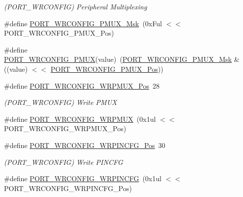 \begin{DoxyCompactItemize}
\begin{DoxyCompactList}\small\item\em (P\+O\+R\+T\+\_\+\+W\+R\+C\+O\+N\+F\+IG) Peripheral Multiplexing \end{DoxyCompactList}\item 
\#define \mbox{\hyperlink{group___s_a_m_d21___p_o_r_t_gaed50ce1ba0629befed40ccf940ea623e}{P\+O\+R\+T\+\_\+\+W\+R\+C\+O\+N\+F\+I\+G\+\_\+\+P\+M\+U\+X\+\_\+\+Msk}}~(0x\+Ful $<$$<$ P\+O\+R\+T\+\_\+\+W\+R\+C\+O\+N\+F\+I\+G\+\_\+\+P\+M\+U\+X\+\_\+\+Pos)
\item 
\#define \mbox{\hyperlink{group___s_a_m_d21___p_o_r_t_ga79d664bf70f1494ebd35f75905b98ca3}{P\+O\+R\+T\+\_\+\+W\+R\+C\+O\+N\+F\+I\+G\+\_\+\+P\+M\+UX}}(value)~(\mbox{\hyperlink{group___s_a_m_d21___p_o_r_t_gaed50ce1ba0629befed40ccf940ea623e}{P\+O\+R\+T\+\_\+\+W\+R\+C\+O\+N\+F\+I\+G\+\_\+\+P\+M\+U\+X\+\_\+\+Msk}} \& ((value) $<$$<$ \mbox{\hyperlink{group___s_a_m_d21___p_o_r_t_gad821493573ea6954861bdb5007458439}{P\+O\+R\+T\+\_\+\+W\+R\+C\+O\+N\+F\+I\+G\+\_\+\+P\+M\+U\+X\+\_\+\+Pos}}))
\item 
\#define \mbox{\hyperlink{group___s_a_m_d21___p_o_r_t_gaf5c01e870b3cd28ea4b5d16e0970f641}{P\+O\+R\+T\+\_\+\+W\+R\+C\+O\+N\+F\+I\+G\+\_\+\+W\+R\+P\+M\+U\+X\+\_\+\+Pos}}~28
\begin{DoxyCompactList}\small\item\em (P\+O\+R\+T\+\_\+\+W\+R\+C\+O\+N\+F\+IG) Write P\+M\+UX \end{DoxyCompactList}\item 
\#define \mbox{\hyperlink{group___s_a_m_d21___p_o_r_t_ga41389a6f616a685fbca4a6cbb6e48206}{P\+O\+R\+T\+\_\+\+W\+R\+C\+O\+N\+F\+I\+G\+\_\+\+W\+R\+P\+M\+UX}}~(0x1ul $<$$<$ P\+O\+R\+T\+\_\+\+W\+R\+C\+O\+N\+F\+I\+G\+\_\+\+W\+R\+P\+M\+U\+X\+\_\+\+Pos)
\item 
\#define \mbox{\hyperlink{group___s_a_m_d21___p_o_r_t_gac9e9a5084c654419e2762a4557fc0fe0}{P\+O\+R\+T\+\_\+\+W\+R\+C\+O\+N\+F\+I\+G\+\_\+\+W\+R\+P\+I\+N\+C\+F\+G\+\_\+\+Pos}}~30
\begin{DoxyCompactList}\small\item\em (P\+O\+R\+T\+\_\+\+W\+R\+C\+O\+N\+F\+IG) Write P\+I\+N\+C\+FG \end{DoxyCompactList}\item 
\#define \mbox{\hyperlink{group___s_a_m_d21___p_o_r_t_gaf100527c943f5f4af1132a46c7d2340f}{P\+O\+R\+T\+\_\+\+W\+R\+C\+O\+N\+F\+I\+G\+\_\+\+W\+R\+P\+I\+N\+C\+FG}}~(0x1ul $<$$<$ P\+O\+R\+T\+\_\+\+W\+R\+C\+O\+N\+F\+I\+G\+\_\+\+W\+R\+P\+I\+N\+C\+F\+G\+\_\+\+Pos)
\item 

\end{DoxyCompactItemize}
